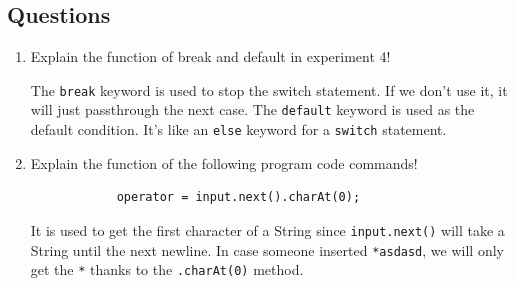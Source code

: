 \documentclass[12pt,titlepage]{article}
\begin{document}
\subsection*{Questions}
\begin{enumerate}
    \item {
        Explain the function of break and default in experiment 4!

        The \texttt{break} keyword is used to stop the switch statement. If we don't use it, it will just passthrough the next case.
        The \texttt{default} keyword is used as the default condition. It's like an \texttt{else} keyword for a \texttt{switch} statement.
    }
    \item {
        Explain the function of the following program code commands!

        \begin{verbatim}
            operator = input.next().charAt(0);
        \end{verbatim}

        It is used to get the first character of a String since \texttt{input.next()} will take a String until the next newline.
        In case someone inserted \texttt{*asdasd}, we will only get the \texttt{*} thanks to the \texttt{.charAt(0)} method.
    }
\end{enumerate}
\end{document}
